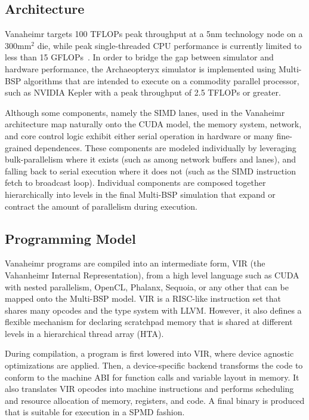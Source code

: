 \documentclass[conference, 10pt]{IEEEtran}
\begin{document}
\subsection{Architecture}
Vanaheimr targets 100 TFLOPs peak throughput at a 5nm technology node on a
300mm$^2$ die, while peak single-threaded CPU performance is currently limited
to less than 15 GFLOPs~\cite{ref:sandybridge-peak}.  In order to bridge the gap
between simulator and hardware performance, the Archaeopteryx simulator is
implemented using Multi-BSP algorithms that are intended to execute on a
commodity parallel processor, such as NVIDIA Kepler with a peak throughput of
2.5 TFLOPs or greater.

Although some components, namely the SIMD lanes, used in the Vanaheimr
architecture map naturally onto the CUDA model, the memory system, network,
and core control logic exhibit either serial operation in hardware or many
fine-grained dependences.  These components are modeled individually by
leveraging bulk-parallelism where it exists (such as among network buffers and
lanes), and falling back to serial execution where it does not (such as the
SIMD instruction fetch to broadcast loop). Individual components are composed 
together hierarchically into levels in the final Multi-BSP simulation that
expand or contract the amount of parallelism during execution.  

\subsection{Programming Model}
Vanaheimr programs are compiled into an intermediate form, VIR (the Vahanheimr
Internal Representation), from a high level language such as CUDA with nested
parallelism, OpenCL, Phalanx, Sequoia, or any other that can be mapped onto
the Multi-BSP model. VIR is a RISC-like instruction set that shares many opcodes
and the type system with LLVM.  However, it also defines a flexible mechanism
for declaring scratchpad memory that is shared at different levels in a 
hierarchical thread array (HTA).  

During compilation, a program is first lowered into VIR, where device agnostic
optimizations are applied. Then, a device-specific backend transforms the code
to conform to the machine ABI for function calls and variable layout in memory. 
It also translates VIR opcodes into machine instructions and performs scheduling
and resource allocation of memory, registers, and code.  A final binary is
produced that is suitable for execution in a SPMD fashion.
\end{document}

